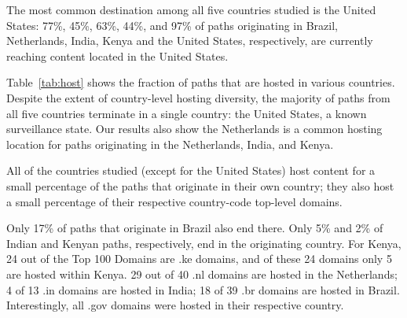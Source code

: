\begin{finding}
The most common destination among all five countries studied is the United States: 77\%, 45\%, 63\%, 44\%, and 97\% of paths originating in Brazil, Netherlands, India, Kenya and the United States, respectively, are currently reaching content located in the United States.
\end{finding}
\noindent
Table~\ref{tab:host} shows the fraction of paths that are hosted in
various countries.  Despite the extent of country-level hosting
diversity, the majority of paths from all five countries terminate in a
single country: the United States, a known surveillance state.   Our results also show the Netherlands is a
common hosting location for paths originating in the Netherlands, India,
and Kenya.



\begin{finding}
All of the countries studied (except for the United States) host content for a small percentage of the paths that originate in their own country; they also host a small percentage of their respective country-code top-level domains.
\end{finding}
\noindent
Only 17\% of paths that originate in Brazil also end there.  Only 5\%
and 2\% of Indian and Kenyan paths, respectively, end in the originating
country.  
For Kenya, 24 out of the Top 100 Domains are .ke domains, and of these 24 domains only 5 are hosted within Kenya.  29 out of 40 .nl domains are hosted in the Netherlands; 4 of 13 .in domains are hosted in India; 18 of 39 .br domains are hosted in Brazil.  Interestingly, all .gov domains were hosted in their respective country. 

